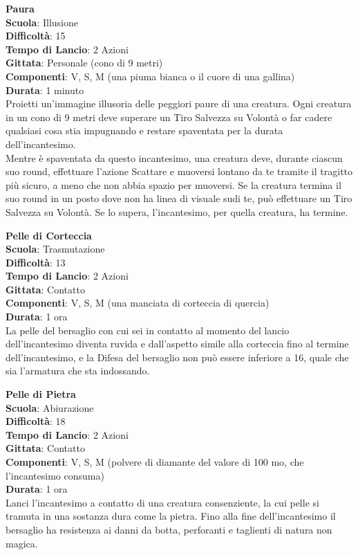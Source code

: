 \begin{multicols}{2}
\medskip\textbf{Paura}\\
\textbf{Scuola}: Illusione\\
\textbf{Difficoltà}:  15\\
\textbf{Tempo di Lancio}: 2 Azioni\\
\textbf{Gittata}: Personale (cono di 9 metri)\\
\textbf{Componenti}: V, S, M (una piuma bianca o il cuore di una gallina)\\
\textbf{Durata}: 1 minuto\\
Proietti un'immagine illusoria delle peggiori paure di una creatura. Ogni creatura in un cono di 9 metri deve superare un Tiro Salvezza su Volontà o far cadere qualsiasi cosa stia impugnando e restare spaventata per la durata dell'incantesimo.\\
Mentre è spaventata da questo incantesimo, una creatura deve, durante ciascun suo round, effettuare l’azione Scattare e muoversi lontano da te tramite il tragitto più sicuro, a meno che non abbia spazio per muoversi. Se la creatura termina il suo round in un posto dove non ha linea di visuale sudi te, può effettuare un  Tiro Salvezza su Volontà. Se lo supera, l'incantesimo, per quella creatura, ha termine. 

\medskip\textbf{Pelle di Corteccia}\\
\textbf{Scuola}: Trasmutazione\\
\textbf{Difficoltà}:  13\\
\textbf{Tempo di Lancio}: 2 Azioni\\
\textbf{Gittata}: Contatto\\
\textbf{Componenti}: V, S, M (una manciata di corteccia di quercia)\\
\textbf{Durata}: 1 ora\\
La pelle del bersaglio con cui sei in contatto al momento del lancio dell'incantesimo diventa ruvida e dall'aspetto simile alla corteccia fino al termine dell'incantesimo, e la Difesa del bersaglio non può essere inferiore a 16, quale che sia l’armatura che sta indossando.

\medskip\textbf{Pelle di Pietra}\\
\textbf{Scuola}: Abiurazione\\
\textbf{Difficoltà}:  18\\
\textbf{Tempo di Lancio}: 2 Azioni\\
\textbf{Gittata}: Contatto\\
\textbf{Componenti}: V, S, M (polvere di diamante del valore di 100 mo, che l'incantesimo consuma)\\
\textbf{Durata}: 1 ora\\
Lanci l'incantesimo a contatto di una creatura consenziente, la cui pelle si tramuta in una sostanza dura come la pietra. Fino alla fine dell'incantesimo il bersaglio ha resistenza ai danni da botta, perforanti e taglienti di natura non magica.


\end{multicols}
